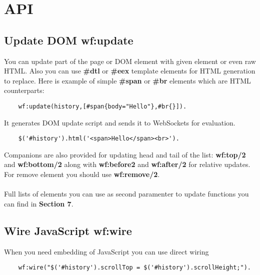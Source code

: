 \section{API}

\subsection{Update DOM \bf{wf:update}}
You can update part of the page or DOM element with given element or even raw HTML.
Also you can use {\bf \#dtl} or {\bf \#eex} template elements for HTML generation to replace.
Here is example of simple {\bf \#span} or {\bf \#br} elements which are HTML counterparts:

\vspace{1\baselineskip}
\begin{lstlisting}
    wf:update(history,[#span{body="Hello"},#br{}]).
\end{lstlisting}
\vspace{1\baselineskip}

It generates DOM update script and sends it to WebSockets for evaluation.

\vspace{1\baselineskip}
\begin{lstlisting}
    $('#history').html('<span>Hello</span><br>').
\end{lstlisting}
\vspace{1\baselineskip}

Companions are also provided for updating head and tail of the list: {\bf wf:top/2}
and {\bf wf:bottom/2} along with {\bf wf:before\/2} and {\bf wf:after/2}
for relative updates. For remove element you should use {\bf wf:remove/2}.

\paragraph{}
Full lists of elements you can use as second paramenter to update functions you can find in {\bf Section 7}.

\subsection{Wire JavaScript \bf{wf:wire}}
When you need embedding of JavaScript you can use direct wiring

\vspace{1\baselineskip}
\begin{lstlisting}
    wf:wire("$('#history').scrollTop = $('#history').scrollHeight;").
\end{lstlisting}
\vspace{1\baselineskip}

